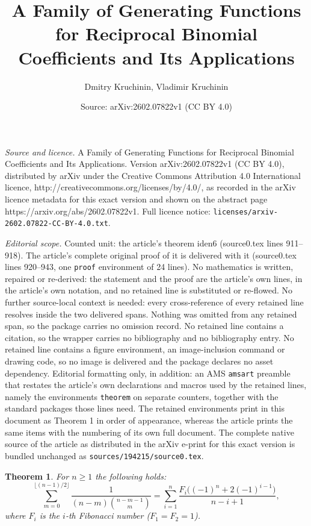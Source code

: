 \documentclass[10pt,a4paper]{amsart}
\title{A Family of Generating Functions for Reciprocal Binomial Coefficients and Its Applications}
\author{Dmitry Kruchinin, Vladimir Kruchinin}
\date{Source: arXiv:2602.07822v1 (CC BY 4.0)}
\newtheorem{theorem}{Theorem}
\begin{document}
\maketitle

\noindent\emph{Source and licence.} A Family of Generating Functions for Reciprocal Binomial Coefficients and Its Applications. Version arXiv:2602.07822v1 (CC BY 4.0), distributed by arXiv under the Creative Commons Attribution 4.0 International licence, http://creativecommons.org/licenses/by/4.0/, as recorded in the arXiv licence metadata for this exact version and shown on the abstract page https://arxiv.org/abs/2602.07822v1. Full licence notice: \texttt{licenses/arxiv-2602.07822-CC-BY-4.0.txt}.\par\smallskip

\noindent\textit{Editorial scope.} Counted unit: the article's theorem iden6 (source0.tex lines 911--918). The article's complete original proof of it is delivered with it (source0.tex lines 920--943, one \texttt{proof} environment of 24 lines). No mathematics is written, repaired or re-derived: the statement and the proof are the article's own lines, in the article's own notation, and no retained line is substituted or re-flowed.  No further source-local context is needed: every cross-reference of every retained line resolves inside the two delivered spans.  Nothing was omitted from any retained span, so the package carries no omission record.  No retained line contains a citation, so the wrapper carries no bibliography and no bibliography entry.  No retained line contains a figure environment, an image-inclusion command or drawing code, so no image is delivered and the package declares no asset dependency.  Editorial formatting only, in addition: an AMS \texttt{amsart} preamble that restates the article's own declarations and macros used by the retained lines, namely the environments \texttt{theorem} on separate counters, together with the standard packages those lines need.  The retained environments print in this document as Theorem 1 in order of appearance, whereas the article prints the same items with the numbering of its own full document.  The complete native source of the article as distributed in the arXiv e-print for this exact version is bundled unchanged as \texttt{sources/194215/source0.tex}.
\begin{theorem}
 For \( n \geq 1 \) the following holds:
\begin{equation}\label{iden6}
\sum_{m=0}^{\lfloor (n-1)/2 \rfloor} \frac{1}{(n-m)\binom{n-m-1}{m}}
= \sum_{i=1}^{n} \frac{F_i\bigl((-1)^n + 2(-1)^{i-1}\bigr)}{n-i+1},
\end{equation}
where \( F_i \) is the \( i \)-th Fibonacci number (\( F_1 = F_2 = 1 \)).
\end{theorem}
\end{document}
